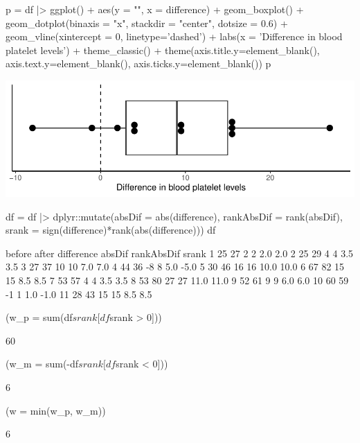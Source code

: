 \documentclass[a4paper]{article}\usepackage[]{graphicx}\usepackage[]{xcolor}
\makeatletter
\def\maxwidth{ %
  \ifdim\Gin@nat@width>\linewidth
    \linewidth
  \else
    \Gin@nat@width
  \fi
}
\makeatother
\begin{document}
\begin{Schunk}
\begin{Sinput}
p = df |> ggplot() +
  aes(y = "", x = difference) + 
  geom_boxplot() +
  geom_dotplot(binaxis = "x", stackdir = "center", dotsize = 0.6) +
  geom_vline(xintercept = 0, linetype='dashed') +
  labs(x = 'Difference in blood platelet levels') +
  theme_classic() +
  theme(axis.title.y=element_blank(),
        axis.text.y=element_blank(),
        axis.ticks.y=element_blank())
p
\end{Sinput}


{\centering \includegraphics[width=\maxwidth]{figure/listings-unnamed-chunk-113-1} 

}

\begin{Sinput}
df = df |> dplyr::mutate(absDif = abs(difference),
                          rankAbsDif = rank(absDif),
                          srank = sign(difference)*rank(abs(difference)))
df
\end{Sinput}
\begin{Soutput}
   before after difference absDif rankAbsDif srank
1      25    27          2      2        2.0   2.0
2      25    29          4      4        3.5   3.5
3      27    37         10     10        7.0   7.0
4      44    36         -8      8        5.0  -5.0
5      30    46         16     16       10.0  10.0
6      67    82         15     15        8.5   8.5
7      53    57          4      4        3.5   3.5
8      53    80         27     27       11.0  11.0
9      52    61          9      9        6.0   6.0
10     60    59         -1      1        1.0  -1.0
11     28    43         15     15        8.5   8.5
\end{Soutput}
\begin{Sinput}
(w_p = sum(df$srank[df$srank > 0]))
\end{Sinput}
\begin{Soutput}
[1] 60
\end{Soutput}
\begin{Sinput}
(w_m = sum(-df$srank[df$srank < 0]))
\end{Sinput}
\begin{Soutput}
[1] 6
\end{Soutput}
\begin{Sinput}
(w = min(w_p, w_m))
\end{Sinput}
\begin{Soutput}
[1] 6
\end{Soutput}
\end{Schunk}
\end{document}
